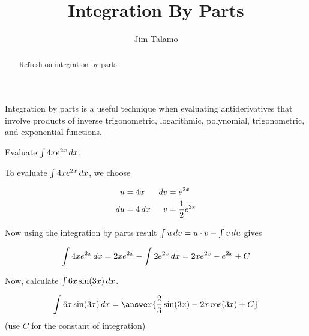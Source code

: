 \documentclass{ximera}
\title[Refresh:]{Integration By Parts}
\author{Jim Talamo}
\begin{document}
\begin{abstract}
 Refresh on integration by parts
\end{abstract}
\maketitle


\begin{exercise}

Integration by parts is a useful technique when evaluating antiderivatives that involve products of inverse trigonometric, logarithmic, polynomial, trigonometric, and exponential functions.  

\begin{example}
Evaluate  $\int 4xe^{2x} \mathop{}\!d x$.

\begin{explanation}
To evaluate $\int 4xe^{2x} \mathop{}\!d x$, we choose

\begin{align*}
u&= 4x & \mathop{}\!d v&=e^{2x} \\
\mathop{}\!d u &= 4 \mathop{}\!d x & v &=\frac{1}{2} e^{2x} \\
\end{align*}

Now using the integration by parts result $\int u \mathop{}\!d v = u \cdot v - \int v \mathop{}\!d u$ gives

\[
\int 4xe^{2x} \mathop{}\!d x = 2x e^{2x} - \int 2 e^{2x} \mathop{}\!d x = 2x e^{2x} -  e^{2x} +C
\]
\end{explanation}
\end{example}

Now, calculate $\int 6x \sin(3x) \mathop{}\!d x$.

\[
\int 6x \sin(3x) \d x= \answer{\frac{2}{3} \sin(3x)-2x\cos(3x)+C}
\] 
(use $C$ for the constant of integration)

\end{exercise}
\end{document}
